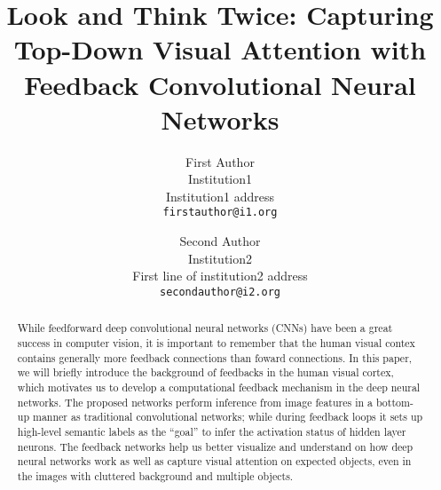 \documentclass[10pt,twocolumn,letterpaper]{article}
\begin{document}
\title{Look and Think Twice: Capturing Top-Down Visual Attention with Feedback Convolutional Neural Networks}

\author{First Author\\
Institution1\\
Institution1 address\\
{\tt\small firstauthor@i1.org}
\and
Second Author\\
Institution2\\
First line of institution2 address\\
{\tt\small secondauthor@i2.org}
}

\maketitle


\begin{abstract}
While feedforward deep convolutional neural networks (CNNs) have been a great success in computer vision, it is important to remember that the human visual contex contains generally more feedback connections than foward connections. In this paper, we will briefly introduce the background of feedbacks in the human visual cortex, which motivates us to develop a computational feedback mechanism in the deep neural networks. The proposed networks perform inference from image features in a bottom-up manner as traditional convolutional networks; while during feedback loops it sets up high-level semantic labels as the “goal” to infer the activation status of hidden layer neurons. The feedback networks help us better visualize and understand on how deep neural networks work as well as capture visual attention on expected objects, even in the images with cluttered background and multiple objects.
\end{abstract}







{\small


}
\end{document}
